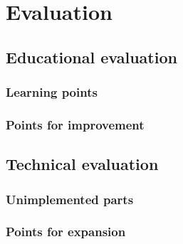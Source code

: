 \chapter{\label{cpt:evaluation}Evaluation}

\section{Educational evaluation}

\subsection{Learning points}

\subsection{Points for improvement}

\section{Technical evaluation}

\subsection{Unimplemented parts}

\subsection{Points for expansion}

